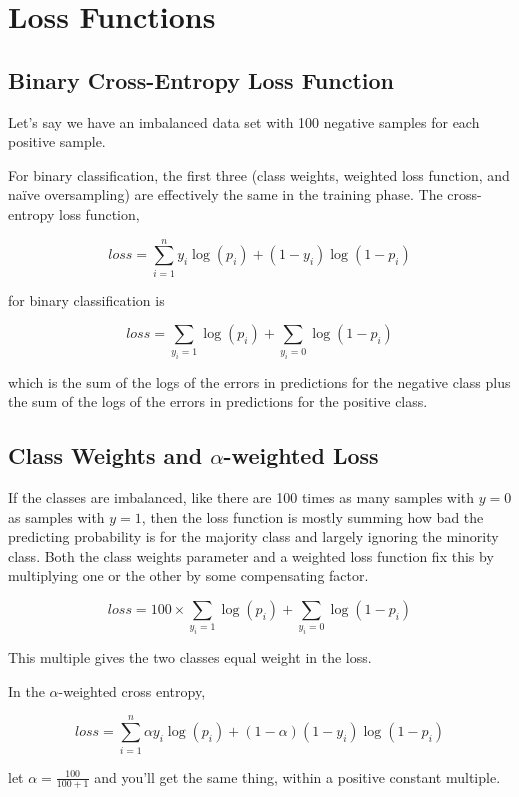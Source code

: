 \section{Loss Functions}

\subsection{Binary Cross-Entropy Loss Function}

Let's say we have an imbalanced data set with 100 negative samples for each positive sample.  

For binary classification, the first three (class weights, weighted loss function, and na\"{i}ve oversampling) are effectively the same in the training phase.  The cross-entropy loss function, 

$$loss = \sum_{i=1}^n y_i \log(p_i) + (1-y_i) \log (1-p_i)$$

for binary classification is

$$loss = \sum_{y_i=1} \log (p_i) + \sum_{y_i=0} \log (1-p_i)$$

which is the sum of the logs of the errors in predictions for the negative class plus the sum of the logs of the errors in predictions for the positive class.  

\subsection{Class Weights and $\alpha$-weighted Loss}

If the classes are imbalanced, like there are 100 times as many samples with $y=0$ as samples with $y=1$, then the loss function is mostly summing how bad the predicting probability is for the majority class and largely ignoring the minority class.  Both the class weights parameter and a weighted loss function fix this by multiplying one or the other by some compensating factor.

$$loss = 100 \times \sum_{y_i=1} \log (p_i) +  \sum_{y_i=0} \log (1-p_i)$$

This multiple gives the two classes equal weight in the loss.  

In the $\alpha$-weighted cross entropy, 

$$loss = \sum_{i=1}^n \alpha y_i \log(p_i) + (1 - \alpha) (1-y_i) \log (1 - p_i)$$

let $\alpha = \frac{100}{100+1}$ and you'll get the same thing, within a positive constant multiple.  

